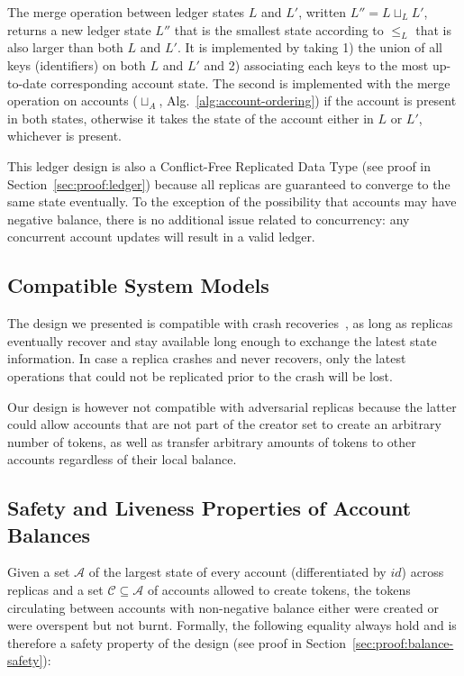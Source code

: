 \documentclass[9pt, oneside]{article}   	%
\begin{document}
The merge operation between ledger states $L$ and $L'$, written $L'' = L \sqcup_L L'$, returns a new ledger state $L''$ that is the smallest state according to $\leq_L$ that is also larger than both $L$ and $L'$. It is implemented by taking 1) the union of all keys (identifiers) on both $L$ and $L'$ and 2) associating each keys to the most up-to-date corresponding account state. The second is implemented with the merge operation on accounts ($\sqcup_A$, Alg.~\ref{alg:account-ordering}) if the account is present in both states, otherwise it takes the state of the account either in $L$ or $L'$, whichever is present.


This ledger design is also a Conflict-Free Replicated Data Type (see proof in Section~\ref{sec:proof:ledger}) because all replicas are guaranteed to converge to the same state eventually. To the exception of the possibility that accounts may have negative balance, there is no additional issue related to concurrency: any concurrent account updates will result in a valid ledger.

\subsection{Compatible System Models}

The design we presented is compatible with crash recoveries~\cite{cachin2011introduction}, as long as replicas eventually recover and stay available long enough to exchange the latest state information. In case a replica crashes and never recovers, only the latest operations that could not be replicated prior to the crash will be lost. 

Our design is however not compatible with adversarial replicas because the latter could allow accounts that are not part of the creator set to create an arbitrary number of tokens, as well as transfer arbitrary amounts of tokens to other accounts regardless of their local balance. 


\subsection{Safety and Liveness Properties of Account Balances}


Given a set $\mathcal{A}$ of the largest state of every account (differentiated by $id$) across replicas and a set $\mathcal{C \subseteq \mathcal{A}}$ of accounts allowed to create tokens, the tokens circulating between accounts with non-negative balance either were created or were overspent but not burnt. Formally, the following equality always hold and is therefore a safety property of the design (see proof in Section~\ref{sec:proof:balance-safety}):
\end{document}
